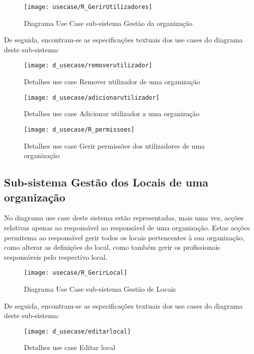 \documentclass[12pt,a4paper]{article}
\begin{document}
\begin{figure}[h!]
\centering
\texttt{[image: usecase/R\_GerirUtilizadores]}
\label{usecase}
\caption{Diagrama Use Case sub-sistema Gestão da organização}
\end{figure}

De seguida, encontram-se as especificações textuais dos use cases do diagrama deste sub-sistema:\\

\begin{figure}[h!]
\centering
\texttt{[image: d\_usecase/removerutilizador]}
\label{usecase}
\caption{Detalhes use case Remover utilizador de uma organização}
\end{figure}

\begin{figure}[h!]
\centering
\texttt{[image: d\_usecase/adicionarutilizador]}
\label{usecase}
\caption{Detalhes use case Adicionar utilizador a uma organização}
\end{figure}

\begin{figure}[h!]
\centering
\texttt{[image: d\_usecase/R\_permissoes]}
\label{usecase}
\caption{Detalhes use case Gerir permissões dos utilizadores de uma organização}
\end{figure}

\clearpage
\clearpage

\subsection{Sub-sistema Gestão dos Locais de uma organização}
No diagrama use case deste sistema estão representadas, mais uma vez, acções relativas
apenas ao responsável ao responsável de uma organização. Estas acções permitema ao responsável gerir todos os locais pertencentes à sua organização, como alterar as definições do local, como também gerir os profissionais responsáveis pelo respectivo local.\\

\begin{figure}[h!]
\centering
\texttt{[image: usecase/R\_GerirLocal]}
\label{usecase}
\caption{Diagrama Use Case sub-sistema Gestão de Locais}
\end{figure}

De seguida, encontram-se as especificações textuais dos use cases do diagrama deste sub-sistema:\\

\begin{figure}[h!]
\centering
\texttt{[image: d\_usecase/editarlocal]}
\label{usecase}
\caption{Detalhes use case Editar local}
\end{figure}
\end{document}
